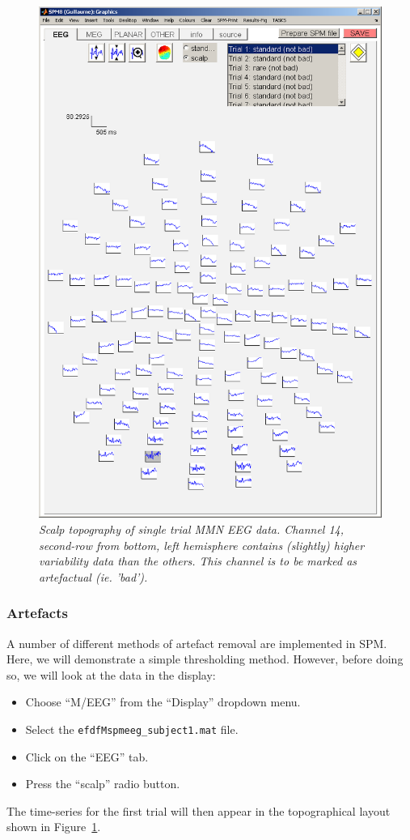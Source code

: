 \begin{figure}
\begin{center}
\includegraphics[width=150mm]{mmn/topo1}
\caption{\em Scalp topography of single trial MMN EEG data. Channel 14, second-row from bottom, left hemisphere contains (slightly) higher variability data than the others. This channel is to be marked as artefactual (ie. 'bad').
\label{topo1}}
\end{center}
\end{figure}

\subsubsection{Artefacts}
 A number of different methods of artefact removal are implemented in SPM. Here, we will demonstrate a simple thresholding method. However, before doing so, we will look at the data in the display:
\begin{itemize}
\item{Choose ``M/EEG'' from the ``Display'' dropdown menu.}
\item{Select the \texttt{efdfMspmeeg\_subject1.mat} file.}
\item{Click on the ``EEG'' tab.}
\item{Press the ``scalp'' radio button.}
\end{itemize}
The time-series for the first trial will then appear in the topographical layout shown in Figure~\ref{topo1}.

